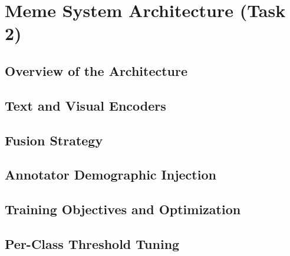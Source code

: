\chapter{Meme System Architecture (Task 2)}\label{cap:development}

\section{Overview of the Architecture}\label{sec:cap04-overview}

\section{Text and Visual Encoders}\label{sec:text-visual-encoders}

\section{Fusion Strategy}\label{sec:fusion-strategy}

\section{Annotator Demographic Injection}\label{sec:annotator-demographic-injection}

\section{Training Objectives and Optimization}\label{sec:cap04-training-objectives}

\section{Per-Class Threshold Tuning}\label{sec:per-class-threshold-tuning}
